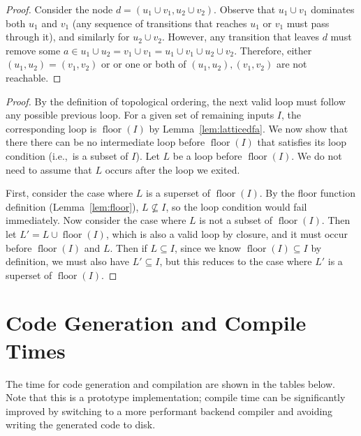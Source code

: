 \documentclass[acmsmall,screen,nonacm]{acmart}\settopmatter{printfolios=true,printccs=false,printacmref=false}
\DeclareMathOperator{\floor}{floor}
\begin{document}
\lemdfauniq*
\begin{proof}
    Consider the node $d = (u_1 \cup v_1, u_2 \cup v_2)$.
    Observe that $u_1 \cup v_1$ dominates both $u_1$ and $v_1$
    (any sequence of transitions that reaches $u_1$ or $v_1$ must pass
    through it), and similarly for $u_2 \cup v_2$.
    However, any transition that leaves $d$ must remove some $a
    \in u_1 \cup u_2 = v_1 \cup v_1 = u_1 \cup v_1 \cup u_2 \cup v_2$.
    Therefore, either $(u_1, u_2) = (v_1, v_2)$ or
    or one or both of $(u_1, u_2), (v_1, v_2)$ are not reachable.
\end{proof}

\lemctrlflow*
\begin{proof}
    By the definition of topological ordering, the next valid loop must follow any possible previous loop. For a given set of remaining inputs $I$, the corresponding loop is $\floor(I)$ by Lemma~\ref{lem:latticedfa}.
    We now show that there there can be no intermediate loop before $\floor(I)$ that satisfies its loop condition (i.e.,\ is a subset of $I$). Let $L$ be a loop before $\floor(I)$. We do not need to assume that $L$ occurs after the loop we exited.
    
    First, consider the case where $L$ is a superset of $\floor(I)$.
    By the floor function definition (Lemma~\ref{lem:floor}), $L \not\subseteq I$, so the loop condition would fail immediately.
    Now consider the case where $L$ is not a subset of $\floor(I)$. Then let $L' = L \cup \floor(I)$, which is also a valid loop by closure, and it must occur before $\floor(I)$ and $L$. Then if $L \subseteq I$, since we know $\floor(I) \subseteq I$ by definition, we must also have $L' \subseteq I$, but this reduces to the case where $L'$ is a superset of $\floor(I)$.
\end{proof}

\section{Code Generation and Compile Times}
The time for code generation and compilation are shown in the tables below. Note that this is a prototype implementation; compile time can be significantly improved by switching to a more performant backend compiler and avoiding writing the generated code to disk.
\end{document}
